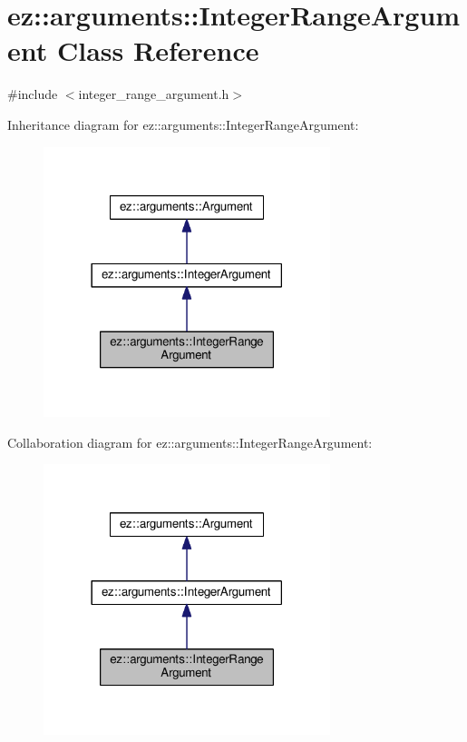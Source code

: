 \hypertarget{classez_1_1arguments_1_1IntegerRangeArgument}{}\section{ez\+:\+:arguments\+:\+:Integer\+Range\+Argument Class Reference}
\label{classez_1_1arguments_1_1IntegerRangeArgument}


{\ttfamily \#include $<$integer\+\_\+range\+\_\+argument.\+h$>$}



Inheritance diagram for ez\+:\+:arguments\+:\+:Integer\+Range\+Argument\+:
\nopagebreak
\begin{figure}[H]
\begin{center}
\leavevmode
\includegraphics[width=237pt]{classez_1_1arguments_1_1IntegerRangeArgument__inherit__graph}
\end{center}
\end{figure}


Collaboration diagram for ez\+:\+:arguments\+:\+:Integer\+Range\+Argument\+:
\nopagebreak
\begin{figure}[H]
\begin{center}
\leavevmode
\includegraphics[width=237pt]{classez_1_1arguments_1_1IntegerRangeArgument__coll__graph}
\end{center}
\end{figure}
